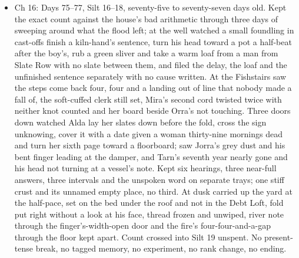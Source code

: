 \documentclass{design/chronicle}
\begin{document}
{\begin{itemize}[leftmargin=1.4em,itemsep=1pt,topsep=3pt,parsep=0pt]
\item Ch 16: Days 75–77, Silt 16–18, seventy-five to seventy-seven days old. Kept the exact count against the house’s bad arithmetic through three days of sweeping around what the flood left; at the well watched a small foundling in cast-offs finish a kiln-hand’s sentence, turn his head toward a pot a half-beat after the boy’s, rub a green sliver and take a warm loaf from a man from Slate Row with no slate between them, and filed the delay, the loaf and the unfinished sentence separately with no cause written. At the Fishstairs saw the steps come back four, four and a landing out of line that nobody made a fall of, the soft-cuffed clerk still set, Mira’s second cord twisted twice with neither knot counted and her board beside Orra’s not touching. Three doors down watched Alda lay her slates down before the fold, cross the sign unknowing, cover it with a date given a woman thirty-nine mornings dead and turn her sixth page toward a floorboard; saw Jorra’s grey dust and his bent finger leading at the damper, and Tarn’s seventh year nearly gone and his head not turning at a vessel’s note. Kept six hearings, three near-full answers, three intervals and the unspoken word on separate trays; one stiff crust and its unnamed empty place, no third. At dusk carried up the yard at the half-pace, set on the bed under the roof and not in the Debt Loft, fold put right without a look at his face, thread frozen and unwiped, river note through the finger’s-width-open door and the fire’s four-four-and-a-gap through the floor kept apart. Count crossed into Silt 19 unspent. No present-tense break, no tagged memory, no experiment, no rank change, no ending.

\end{itemize}

\begin{itemize}[leftmargin=1.4em,itemsep=1pt,topsep=3pt,parsep=0pt]


\end{itemize}}
\end{document}
